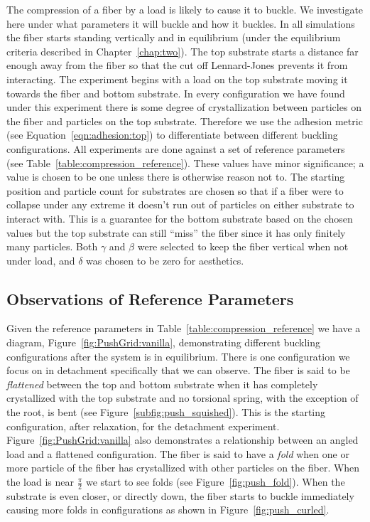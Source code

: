 The compression of a fiber by a load is likely to cause it to buckle. We investigate here under what parameters it will buckle and how it buckles. In all simulations the fiber starts standing vertically and in equilibrium (under the equilibrium criteria described in Chapter~\ref{chap:two}). The top substrate starts a distance far enough away from the fiber so that the cut off Lennard-Jones prevents it from interacting. The experiment begins with a load on the top substrate moving it towards the fiber and bottom substrate. In every configuration we have found under this experiment there is some degree of crystallization between particles on the fiber and particles on the top substrate. Therefore we use the adhesion metric (see Equation~\ref{eqn:adhesion:top}) to differentiate between different buckling configurations. All experiments are done against a set of reference parameters (see Table~\ref{table:compression_reference}). These values have minor significance; a value is chosen to be one unless there is otherwise reason not to. The starting position and particle count for substrates are chosen so that if a fiber were to collapse under any extreme it doesn't run out of particles on either substrate to interact with. This is a guarantee for the bottom substrate based on the chosen values but the top substrate can still ``miss'' the fiber since it has only finitely many particles. Both $\gamma$ and $\beta$ were selected to keep the fiber vertical when not under load, and $\delta$ was chosen to be zero for aesthetics.

\subsection{Observations of Reference Parameters}

Given the reference parameters in Table~\ref{table:compression_reference} we have a diagram, Figure~\ref{fig:PushGrid:vanilla}, demonstrating different buckling configurations after the system is in equilibrium. There is one configuration we focus on in detachment specifically that we can observe. The fiber is said to be \textit{flattened} between the top and bottom substrate when it has completely crystallized with the top substrate and no torsional spring, with the exception of the root, is bent (see Figure~\ref{subfig:push_squished}). This is the starting configuration, after relaxation, for the detachment experiment. Figure~\ref{fig:PushGrid:vanilla} also demonstrates a relationship between an angled load and a flattened configuration. The fiber is said to have a \textit{fold} when one or more particle of the fiber has crystallized with other particles on the fiber. When the load is near $\frac{\pi}{2}$ we start to see folds (see Figure~\ref{fig:push_fold}). When the substrate is even closer, or directly down, the fiber starts to buckle immediately causing more folds in configurations as shown in Figure~\ref{fig:push_curled}.

